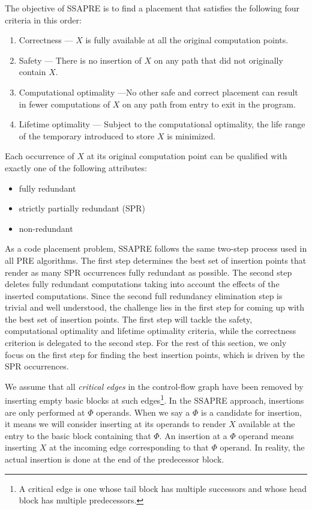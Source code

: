 The objective of SSAPRE is to find
a placement that satisfies the following four criteria in this order:
\begin{enumerate}
\item Correctness --- $X$ is fully available at all the original computation
points.
\item Safety --- There is no insertion of $X$ on any path that did not 
originally contain $X$. 
\item Computational optimality ---No other safe and correct placement can 
result in fewer computations of $X$ on any path from entry to exit in the program.
\item Lifetime optimality --- Subject to the computational optimality,
the life range of the temporary introduced to store $X$ is minimized.
\end{enumerate}

Each occurrence of $X$ at its original computation point can be qualified
with exactly one of the following attributes:
\begin{itemize}
\item fully redundant
\item strictly partially redundant (SPR)
\item non-redundant
\end{itemize}

As a code placement problem, SSAPRE follows the same two-step process used
in all PRE algorithms.  The first step determines the best set of insertion 
points that render as many SPR occurrences fully redundant as possible.
The second step deletes fully redundant computations taking into account the
effects of the inserted computations.  Since the second full redundancy
elimination step is 
trivial and well understood, the challenge lies in the first step
for coming up with the best set of insertion points.  The first step will
tackle the safety, computational optimality and lifetime optimality criteria,
while the correctness criterion is delegated to the second step.
For the rest of this section, we only focus on the first step for
finding the best insertion points, which is driven by the SPR occurrences.

We assume that all \emph{critical edges}
in the control-flow graph have been removed by inserting empty basic blocks
at such edges\footnote{A critical edge is one whose tail block has multiple
successors and whose head block has multiple predecessors.}.
In the SSAPRE approach, insertions are only performed at $\Phi$ operands.
When we say a $\Phi$ is a candidate for insertion, it means we will consider
inserting at its operands to render $X$ available at the entry to the basic
block containing that $\Phi$.  An insertion at a $\Phi$ operand means inserting
$X$ at the incoming edge corresponding to that $\Phi$ operand.  In reality,
the actual insertion is done at the end of the predecessor block.

